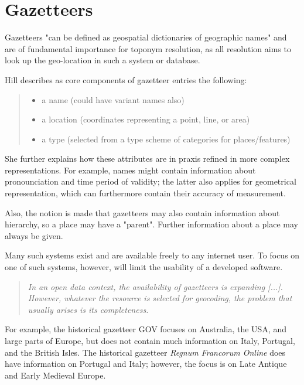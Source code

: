 \documentclass[11pt]{article}
\begin{document}
\newpage
\section{Gazetteers}
Gazetteers "can be defined as geospatial dictionaries of geographic names"\cite{hill00} and are of fundamental importance for toponym resolution, as all resolution aims to look up the geo-location in such a system or database.

Hill describes as core components of gazetteer entries the following:

\begin{quote}
\begin{itemize}
\item a name (could have variant names also)
\item a location (coordinates representing a point, line, or area)
\item a type (selected from a type scheme of categories for places/features)\\\cite[p. 1]{hill00}
\end{itemize}
\end{quote}

She further explains how these attributes are in praxis refined in more complex representations. For example, names might contain information about pronounciation and time period of validity; the latter also applies for geometrical representation, which can furthermore contain their accuracy of measurement.

Also, the notion is made that gazetteers may also contain information about hierarchy, so a place may have a "parent". Further information about a place may always be given.

Many such systems exist and are available freely to any internet user. To focus on one of such systems, however, will limit the usability of a developed software.

\begin{quote}\emph{
In an open data context, the availability of gazetteers is expanding [...]. However, whatever the resource is selected for geocoding, the problem that usually arises is its completeness.
}\cite{moncla14}
\end{quote}

For example, the historical gazetteer GOV focuses on Australia, the USA, and large parts of Europe, but does not contain much information on Italy, Portugal, and the British Isles. The historical gazetteer \emph{Regnum Francorum Online} does have information on Portugal and Italy; however, the focus is on Late Antique and Early Medieval Europe.
\end{document}
